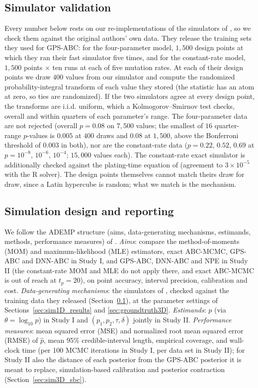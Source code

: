\documentclass[sn-basic,iicol,pdflatex]{sn-jnl}
\begin{document}
\subsection{Simulator validation}
\label{sec:validation}

Every number below rests on our re-implementations of the simulators of
\citet{lu2023}, so we check them against the original authors' own data. They
release the training sets they used for GPS-ABC: for the four-parameter model,
$1{,}500$ design points at which they ran their fast simulator five times, and
for the constant-rate model, $1{,}500$ points $\times$ ten runs at each of five
mutation rates. At each of their design points we draw $400$ values from our
simulator and compute the randomized probability-integral transform of each
value they stored (the statistic has an atom at zero, so ties are randomized).
If the two simulators agree at every design point, the transforms are i.i.d.
uniform, which a Kolmogorov--Smirnov test checks, overall and within quarters of
each parameter's range. The four-parameter data are not rejected
(overall $p=0.08$ on $7{,}500$ values; the smallest of $16$ quarter-range
$p$-values is $0.005$ at $400$ draws and $0.08$ at $1{,}500$, above the
Bonferroni threshold of $0.003$ in both), nor are the constant-rate data
($p=0.22$, $0.52$, $0.69$ at $p=10^{-8}$, $10^{-6}$, $10^{-4}$; $15{,}000$ values
each). The constant-rate exact simulator is additionally checked against the plating-time
equation of \citet{lu2023} (agreement to $3\times10^{-5}$ with the R solver). The
design points themselves cannot match theirs draw for draw, since a Latin hypercube
is random; what we match is the mechanism.

\subsection{Simulation design and reporting}
\label{sec:ademp}

We follow the ADEMP structure (aims, data-generating mechanisms, estimands, methods, performance measures) of \citet{morris2019}. \emph{Aims}: compare the method-of-moments (MOM) and
maximum-likelihood (MLE) estimators, exact ABC-MCMC, GPS-ABC and DNN-ABC in Study I, and GPS-ABC, DNN-ABC and NPE in
Study II (the constant-rate MOM and MLE do not apply there, and exact ABC-MCMC is out
of reach at $t_p=20$), on point accuracy, interval precision, calibration and cost.
\emph{Data-generating mechanisms}: the simulators of \citet{lu2023}, checked against
the training data they released (Section~\ref{sec:validation}), at the parameter
settings of Sections~\ref{sec:sim1D_results} and \ref{sec:groundtruth3D}.
\emph{Estimands}: $p$ (via $\theta=\log_{10}p$) in Study I and
$(p_1,p_2,\tau,\delta)$ jointly in Study II. \emph{Performance measures}: mean squared error (MSE) and
normalized root mean squared error (RMSE) of $\hat p$, mean 95\% credible-interval length, empirical coverage, and
wall-clock time (per 100 MCMC iterations in Study I, per data set in Study II); for
Study II also the distance of each posterior from the GPS-ABC posterior it is meant to
replace, simulation-based calibration and posterior contraction
(Section~\ref{sec:sim3D_sbc}).
\end{document}

